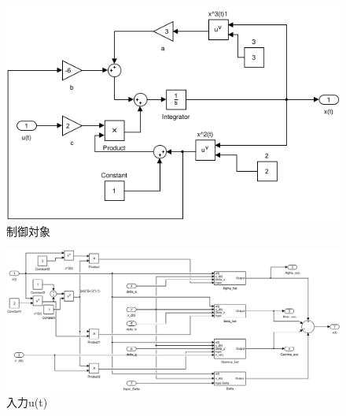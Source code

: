\documentclass[a4paper,12pt]{jarticle}
\begin{document}
\begin{figure}[H]
 \begin{center}
  \includegraphics[scale=0.6]{../figure/fig/controlled_model.png}
  \caption{制御対象}
  \label{controlled_model}
 \end{center}
\end{figure}
\begin{figure}[H]
 \begin{center}
  \includegraphics[scale=0.6]{../figure/fig/input.png}
  \caption{入力u(t)}
  \label{controlled_model}
 \end{center}
\end{figure}
\end{document}
